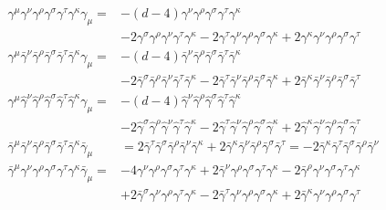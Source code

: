\documentclass[../FeynCalcManual.tex]{subfiles}
\begin{document}
\begin{align}
\gamma^\mu \gamma^\nu \gamma^\rho \gamma^\sigma \gamma^\tau \gamma^\kappa \gamma_\mu =& -(d-4) \gamma^\nu \gamma^\rho \gamma^\sigma \gamma^\tau \gamma^\kappa \\
&- 2 \gamma^\sigma \gamma^\rho \gamma^\nu \gamma^\tau \gamma^\kappa - 2 \gamma^\tau \gamma^\nu \gamma^\rho \gamma^\sigma \gamma^\kappa + 2\gamma^\kappa \gamma^\nu \gamma^\rho \gamma^\sigma \gamma^\tau \\
\gamma^\mu \bar{\gamma}^\nu \bar{\gamma}^\rho \bar{\gamma}^\sigma \bar{\gamma}^\tau \bar{\gamma}^\kappa \gamma_\mu =& -(d-4) \bar{\gamma}^\nu \bar{\gamma}^\rho \bar{\gamma}^\sigma \bar{\gamma}^\tau \bar{\gamma}^\kappa \\
& - 2 \bar{\gamma}^\sigma \bar{\gamma}^\rho \bar{\gamma}^\nu \bar{\gamma}^\tau \bar{\gamma}^\kappa - 2 \bar{\gamma}^\tau \bar{\gamma}^\nu \bar{\gamma}^\rho \bar{\gamma}^\sigma \bar{\gamma}^\kappa + 2\bar{\gamma}^\kappa \bar{\gamma}^\nu \bar{\gamma}^\rho \bar{\gamma}^\sigma \bar{\gamma}^\tau\\
\gamma^\mu \hat{\gamma}^\nu \hat{\gamma}^\rho \hat{\gamma}^\sigma \hat{\gamma}^\tau \hat{\gamma}^\kappa \gamma_\mu =& -(d-4) \hat{\gamma}^\nu \hat{\gamma}^\rho \hat{\gamma}^\sigma \hat{\gamma}^\tau \hat{\gamma}^\kappa \\
& - 2 \hat{\gamma}^\sigma \hat{\gamma}^\rho \hat{\gamma}^\nu \hat{\gamma}^\tau \hat{\gamma}^\kappa - 2 \hat{\gamma}^\tau \hat{\gamma}^\nu \hat{\gamma}^\rho \hat{\gamma}^\sigma \hat{\gamma}^\kappa + 2\hat{\gamma}^\kappa \hat{\gamma}^\nu \hat{\gamma}^\rho \hat{\gamma}^\sigma \hat{\gamma}^\tau \\
\bar{\gamma}^\mu \bar{\gamma}^\nu \bar{\gamma}^\rho \bar{\gamma}^\sigma \bar{\gamma}^\tau \bar{\gamma}^\kappa \bar{\gamma}_\mu & = 2 \bar{\gamma}^\tau \bar{\gamma}^\sigma \bar{\gamma}^\rho \bar{\gamma}^\nu \bar{\gamma}^\kappa + 2 \bar{\gamma}^\kappa \bar{\gamma}^\nu \bar{\gamma}^\rho \bar{\gamma}^\sigma \bar{\gamma}^\tau = - 2 \bar{\gamma}^\kappa \bar{\gamma}^\tau \bar{\gamma}^\sigma \bar{\gamma}^\rho \bar{\gamma}^\nu  \\
\bar{\gamma}^\mu \gamma^\nu \gamma^\rho  \gamma^\sigma \gamma^\tau \gamma^\kappa \bar{\gamma}_\mu =& -4 \gamma^\nu \gamma^\rho \gamma^\sigma \gamma^\tau \gamma^\kappa + 2 \bar{\gamma}^\nu \gamma^\rho \gamma^\sigma \gamma^\tau \gamma^\kappa - 2\bar{\gamma}^\rho \gamma^\nu \gamma^\sigma \gamma^\tau \gamma^\kappa \\
&+ 2 \bar{\gamma}^\sigma \gamma^\nu \gamma^\rho \gamma^\tau \gamma^\kappa - 2 \bar{\gamma}^\tau \gamma^\nu \gamma^\rho \gamma^\sigma \gamma^\kappa + 2\bar{\gamma}^\kappa \gamma^\nu \gamma^\rho \gamma^\sigma \gamma^\tau \\

\end{align}
\end{document}
